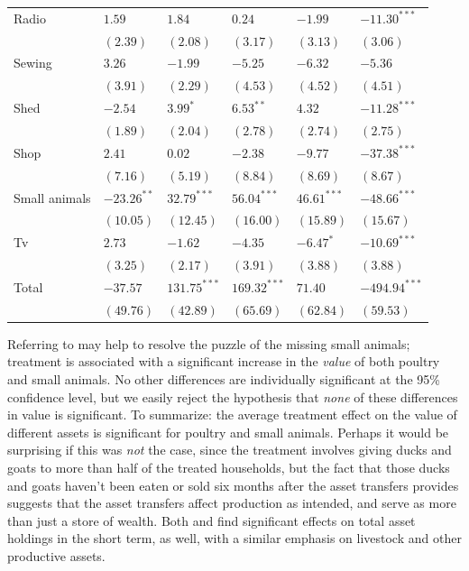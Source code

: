 \documentclass[12pt,letterpaper]{article}
\begin{document}
\begin{table}[htb]
\begin{tabular}{llllll}
Radio & \(1.59\) & \(1.84\) & \(0.24\) & \(-1.99\) & \(-11.30^{***}\)\\
 & \((2.39)\) & \((2.08)\) & \((3.17)\) & \((3.13)\) & \((3.06)\)\\
Sewing & \(3.26\) & \(-1.99\) & \(-5.25\) & \(-6.32\) & \(-5.36\)\\
 & \((3.91)\) & \((2.29)\) & \((4.53)\) & \((4.52)\) & \((4.51)\)\\
Shed & \(-2.54\) & \(3.99^{*}\) & \(6.53^{**}\) & \(4.32\) & \(-11.28^{***}\)\\
 & \((1.89)\) & \((2.04)\) & \((2.78)\) & \((2.74)\) & \((2.75)\)\\
Shop & \(2.41\) & \(0.02\) & \(-2.38\) & \(-9.77\) & \(-37.38^{***}\)\\
 & \((7.16)\) & \((5.19)\) & \((8.84)\) & \((8.69)\) & \((8.67)\)\\
Small animals & \(-23.26^{**}\) & \(32.79^{***}\) & \(56.04^{***}\) & \(46.61^{***}\) & \(-48.66^{***}\)\\
 & \((10.05)\) & \((12.45)\) & \((16.00)\) & \((15.89)\) & \((15.67)\)\\
Tv & \(2.73\) & \(-1.62\) & \(-4.35\) & \(-6.47^{*}\) & \(-10.69^{***}\)\\
 & \((3.25)\) & \((2.17)\) & \((3.91)\) & \((3.88)\) & \((3.88)\)\\
\hline
Total & \(-37.57\) & \(131.75^{***}\) & \(169.32^{***}\) & \(71.40\) & \(-494.94^{***}\)\\
 & \((49.76)\) & \((42.89)\) & \((65.69)\) & \((62.84)\) & \((59.53)\)\\
\end{tabular}
\end{table}


Referring to  may help to resolve the puzzle
of the missing small animals; treatment is associated with a
significant increase in the \emph{value} of both poultry and small animals.
No other differences are individually significant at the 95\%
confidence level, but we easily reject the hypothesis that \emph{none} of
these differences in value is significant.  To summarize: the average
treatment effect on the value of different assets is significant for
poultry and small animals.  Perhaps it would be surprising if this was
\emph{not} the case, since the treatment involves giving ducks and goats to
more than half of the treated households, but the fact that those
ducks and goats haven't been eaten or sold six months after the asset
transfers provides suggests that the asset transfers
affect production as intended, and serve as more than just a store of wealth. Both
\cite{banerjee-etal15} and \cite{Bandiera-etal15} find significant effects on total
asset holdings in the short term, as well, with a similar emphasis on livestock and
other productive assets. 
\end{document}
